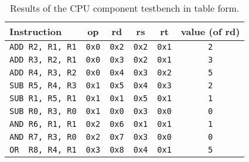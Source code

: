 \documentclass[11pt]{report}
\begin{document}
\begin{table}[ht!]
    \centering
    \begin{tabular}{|l||c|c|c|c|c|} 
     \hline
     Instruction & op & rd & rs & rt & value (of rd) \\
     \hline
     \verb|ADD R2, R1, R1| & \verb|0x0| & \verb|0x2| & \verb|0x2| & \verb|0x1| & \verb|2| \\ 
     \hline                                                                             
     \verb|ADD R3, R2, R1| & \verb|0x0| & \verb|0x3| & \verb|0x2| & \verb|0x1| & \verb|3| \\
     \hline                                                                             
     \verb|ADD R4, R3, R2| & \verb|0x0| & \verb|0x4| & \verb|0x3| & \verb|0x2| & \verb|5| \\
     \hline                                                                             
     \verb|SUB R5, R4, R3| & \verb|0x1| & \verb|0x5| & \verb|0x4| & \verb|0x3| & \verb|2| \\ 
     \hline                                                                             
     \verb|SUB R1, R5, R1| & \verb|0x1| & \verb|0x1| & \verb|0x5| & \verb|0x1| & \verb|1| \\
     \hline                                                                             
     \verb|SUB R0, R3, R0| & \verb|0x1| & \verb|0x0| & \verb|0x3| & \verb|0x0| & \verb|0| \\
     \hline                                                                             
     \verb|AND R6, R1, R1| & \verb|0x2| & \verb|0x6| & \verb|0x1| & \verb|0x1| & \verb|1| \\ 
     \hline                                                                             
     \verb|AND R7, R3, R0| & \verb|0x2| & \verb|0x7| & \verb|0x3| & \verb|0x0| & \verb|0| \\
     \hline
     \verb|OR  R8, R4, R1| & \verb|0x3| & \verb|0x8| & \verb|0x4| & \verb|0x1| & \verb|5| \\
     \hline
    \end{tabular}
    \caption{Results of the CPU component testbench in table form.}
    \label{table:CPU-waveform_table}
\end{table}
\end{document}
